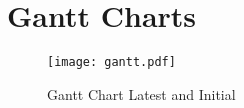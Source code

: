 \chapter{Gantt Charts}
\label{appendix:gantt-charts}

\pagebreak

\begin{sidewaysfigure}
    \centering
    \texttt{[image: gantt.pdf]}
    \caption{Gantt Chart Latest and Initial}
    \label{fig:gantt-chart}
\end{sidewaysfigure}